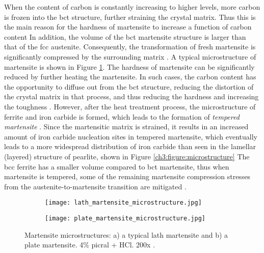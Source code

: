 When the content of carbon is constantly increasing to higher levels, more carbon is frozen into the bct structure, further straining the crystal matrix. Thus this is the main reason for the hardness of martensite to increase a function of carbon content \cite{bajaj2020steels} In addition, the volume of the bct martensite structure is larger than that of the fcc austenite. Consequently, the transformation of fresh martensite is significantly compressed by the surrounding matrix \cite{bajaj2020steels}. A typical microstructure of martensite is shown in Figure \ref{ch3:figure:martensite:microstructures}.
The hardness of martensite can be significantly reduced by further heating the martensite. In such cases, the carbon content has the opportunity to diffuse out from the bct structure, reducing the distortion of the crystal matrix in that process, and thus reducing the hardness and increasing the toughness \cite{bhadeshia2017steels}. However, after the heat treatment process, the microstructure of ferrite and iron carbide is formed, which leads to the formation of \emph{tempered martensite} \cite{bajaj2020steels}. Since the martensitic matrix is strained, it results in an increased amount of iron carbide nucleation sites in tempered martensite, which eventually leads to a more widespread distribution of iron carbide than seen in the lamellar (layered) structure of pearlite, shown in Figure \ref{ch3:figure:microstructure} \cite{bajaj2020steels} The bcc ferrite has a smaller volume compared to bct martensite, thus when martensite is tempered, some of the remaining martensite compression stresses from the austenite-to-martensite transition are mitigated \cite{molabe2018determining}.

\begin{figure}[H]
\centering

\begin{subfigure}{.45\textwidth}
    \centering
    \texttt{[image: lath\_martensite\_microstructure.jpg]}
    \caption{}
\end{subfigure}
\begin{subfigure}{.45\textwidth}
    \centering
    \texttt{[image: plate\_martensite\_microstructure.jpg]}
    \caption{}
\end{subfigure}

\caption{Martensite microstructures: a) a typical lath martensite and b) a plate martensite. 4\% picral + HCl. 200x \cite{molabe2018determining}.}
\label{ch3:figure:martensite:microstructures}
\end{figure}

